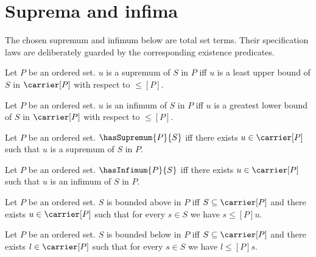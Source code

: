 \section{Suprema and infima}




The chosen supremum and infimum below are total set terms.  Their
specification laws are deliberately guarded by the corresponding existence
predicates.

\begin{definition}\label{supremum_element}
    Let $P$ be an ordered set.
    $u$ is a supremum of $S$ in $P$ iff
        $u$ is a least upper bound of $S$ in $\carrier[P]$
            with respect to $\leq[P]$.
\end{definition}

\begin{definition}\label{infimum_element}
    Let $P$ be an ordered set.
    $u$ is an infimum of $S$ in $P$ iff
        $u$ is a greatest lower bound of $S$ in $\carrier[P]$
            with respect to $\leq[P]$.
\end{definition}

\begin{definition}\label{has_supremum}
    Let $P$ be an ordered set.
    $\hasSupremum{P}{S}$ iff
        there exists $u\in\carrier[P]$ such that
            $u$ is a supremum of $S$ in $P$.
\end{definition}

\begin{definition}\label{has_infimum}
    Let $P$ be an ordered set.
    $\hasInfimum{P}{S}$ iff
        there exists $u\in\carrier[P]$ such that
            $u$ is an infimum of $S$ in $P$.
\end{definition}

\begin{definition}\label{bounded_above_in_ordered_set}
    Let $P$ be an ordered set.
    $S$ is bounded above in $P$ iff
        $S\subseteq\carrier[P]$ and there exists $u\in\carrier[P]$
            such that for every $s\in S$ we have
                $s\mathrel{\leq[P]}u$.
\end{definition}

\begin{definition}\label{bounded_below_in_ordered_set}
    Let $P$ be an ordered set.
    $S$ is bounded below in $P$ iff
        $S\subseteq\carrier[P]$ and there exists $l\in\carrier[P]$
            such that for every $s\in S$ we have
                $l\mathrel{\leq[P]}s$.
\end{definition}

